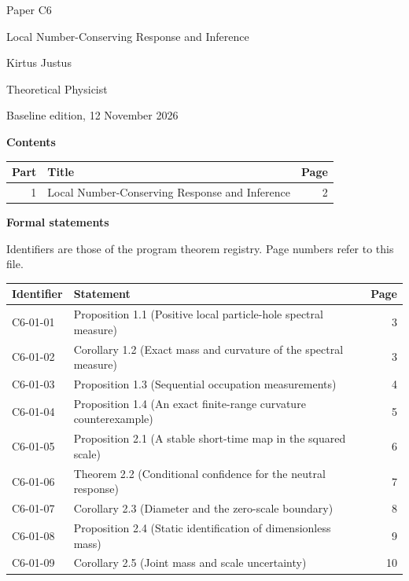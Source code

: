 \documentclass[11pt,a4paper]{article}
\begin{document}
\thispagestyle{empty}\pagestyle{empty}
{\small\sffamily \ProgramTitle\hfill Paper C6\par}
\vspace*{12mm}
{\LARGE\bfseries\raggedright{} Local Number-Conserving Response and Inference\par}
\vspace{9mm}
{\large Kirtus Justus\par}\vspace{1mm}Theoretical Physicist\par\AuthorLocation\par\vspace{2mm}Baseline edition, 12 November 2026\par\vspace{8mm}
\textbf{Contents}\par\vspace{1mm}
{\small\begin{longtable}{@{}r>{\raggedright\arraybackslash}p{}r@{}}
\toprule Part & Title & Page\\\midrule\endhead
1 & Local Number-Conserving Response and Inference & 2\\
\bottomrule\end{longtable}}
\vspace{2mm}\textbf{Formal statements}\par\vspace{1mm}
{\footnotesize Identifiers are those of the program theorem registry. Page numbers refer to this file.\par}
{\footnotesize\begin{longtable}{@{}l>{\raggedright\arraybackslash}p{}r@{}}
\toprule Identifier & Statement & Page\\\midrule\endhead
C6-01-01 & Proposition 1.1 (Positive local particle-hole spectral measure) & 3\\
C6-01-02 & Corollary 1.2 (Exact mass and curvature of the spectral measure) & 3\\
C6-01-03 & Proposition 1.3 (Sequential occupation measurements) & 4\\
C6-01-04 & Proposition 1.4 (An exact finite-range curvature counterexample) & 5\\
C6-01-05 & Proposition 2.1 (A stable short-time map in the squared scale) & 6\\
C6-01-06 & Theorem 2.2 (Conditional confidence for the neutral response) & 7\\
C6-01-07 & Corollary 2.3 (Diameter and the zero-scale boundary) & 8\\
C6-01-08 & Proposition 2.4 (Static identification of dimensionless mass) & 9\\
C6-01-09 & Corollary 2.5 (Joint mass and scale uncertainty) & 10\\
\bottomrule\end{longtable}}
\end{document}
